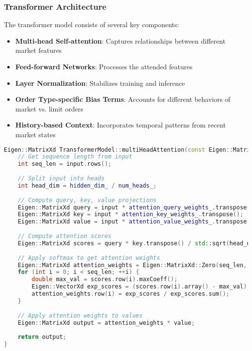 \documentclass[10pt,twocolumn,a4paper]{IEEEtran}
\begin{document}
\subsubsection{Transformer Architecture}

The transformer model consists of several key components:

\begin{itemize}
    \item \textbf{Multi-head Self-attention}: Captures relationships between different market features
    \item \textbf{Feed-forward Networks}: Processes the attended features
    \item \textbf{Layer Normalization}: Stabilizes training and inference
    \item \textbf{Order Type-specific Bias Terms}: Accounts for different behaviors of market vs. limit orders
    \item \textbf{History-based Context}: Incorporates temporal patterns from recent market states
\end{itemize}

\begin{lstlisting}[language=C++, caption=Multi-head Attention Implementation]
Eigen::MatrixXd TransformerModel::multiHeadAttention(const Eigen::MatrixXd& input) {
    // Get sequence length from input
    int seq_len = input.rows();
    
    // Split input into heads
    int head_dim = hidden_dim_ / num_heads_;
    
    // Compute query, key, value projections
    Eigen::MatrixXd query = input * attention_query_weights_.transpose();
    Eigen::MatrixXd key = input * attention_key_weights_.transpose();
    Eigen::MatrixXd value = input * attention_value_weights_.transpose();
    
    // Compute attention scores
    Eigen::MatrixXd scores = query * key.transpose() / std::sqrt(head_dim);
    
    // Apply softmax to get attention weights
    Eigen::MatrixXd attention_weights = Eigen::MatrixXd::Zero(seq_len, seq_len);
    for (int i = 0; i < seq_len; ++i) {
        double max_val = scores.row(i).maxCoeff();
        Eigen::VectorXd exp_scores = (scores.row(i).array() - max_val).exp();
        attention_weights.row(i) = exp_scores / exp_scores.sum();
    }
    
    // Apply attention weights to values
    Eigen::MatrixXd output = attention_weights * value;
    
    return output;
}
\end{lstlisting}
\end{document}
